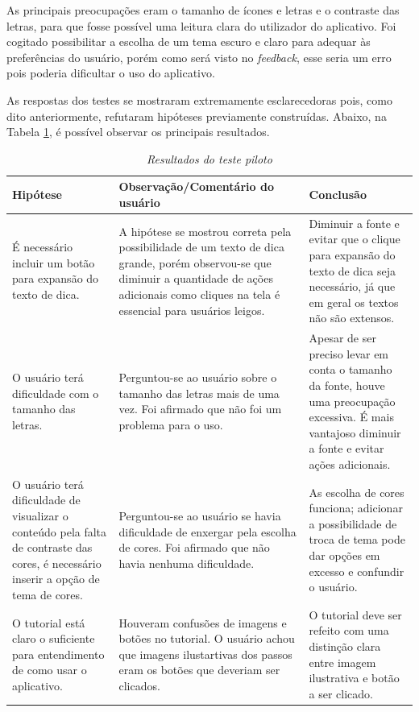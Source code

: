 As principais preocupações eram o tamanho de ícones e letras e o contraste das letras, para que fosse possível uma leitura clara do utilizador do aplicativo. Foi cogitado possibilitar a escolha de um tema escuro e claro para adequar às preferências do usuário, porém como será visto no \textit{feedback}, esse seria um erro pois poderia dificultar o uso do aplicativo.

As respostas dos testes se mostraram extremamente esclarecedoras pois, como dito anteriormente, refutaram hipóteses previamente construídas. Abaixo, na Tabela \ref{tab:feedback-teste-piloto}, é possível observar os principais resultados.

\begin{table}[H]
\centering
\caption{\textit{Resultados do teste piloto}}
\centering
\footnotesize
\begin{tabular}{p{5cm} p{5cm} p{5cm}}
\toprule
\textbf{Hipótese} & \textbf{Observação/Comentário do usuário} & \textbf{Conclusão}                                   
\\ \midrule
É necessário incluir um botão para expansão 
do texto de dica.
& 
A hipótese se mostrou correta pela possibilidade de um texto de dica grande, porém observou-se que diminuir a quantidade de ações adicionais como cliques na tela é essencial para usuários leigos.
&
Diminuir a fonte e evitar que o clique para expansão do texto de dica seja necessário, já que em geral os textos não são extensos.
\\ \midrule
O usuário terá dificuldade com o tamanho das letras.
& 
Perguntou-se ao usuário sobre o tamanho das letras mais de uma vez. Foi afirmado que não foi um problema para o uso.
&
Apesar de ser preciso levar em conta o tamanho da fonte, houve uma preocupação excessiva. 
É mais vantajoso diminuir a fonte e evitar ações adicionais.
\\ \midrule
O usuário terá dificuldade de visualizar o 
conteúdo pela falta de contraste das cores, é necessário inserir a opção de tema de cores.
& 
Perguntou-se ao usuário se havia dificuldade de enxergar pela escolha de cores. Foi afirmado que não havia nenhuma dificuldade.
&
As escolha de cores funciona; adicionar a possibilidade de troca de tema pode dar opções em excesso e
 confundir o usuário.
\\ \midrule
O tutorial está claro o suficiente para entendimento de como usar o aplicativo.
&
Houveram confusões de imagens e botões
no tutorial. O usuário achou que imagens 
ilustartivas dos passos eram os botões que 
deveriam ser clicados.
&
O tutorial deve ser refeito com uma distinção clara entre imagem ilustrativa e botão a ser clicado.
\\ \midrule
\end{tabular}
\label{tab:feedback-teste-piloto}
\end{table}

